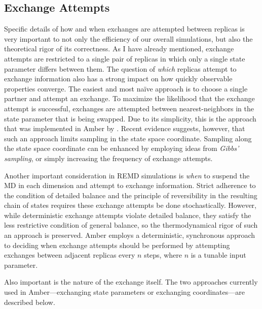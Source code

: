 \subsection{Exchange Attempts}

Specific details of how and when exchanges are attempted between replicas is
very important to not only the efficiency of our overall simulations, but also
the theoretical rigor of its correctness. As I have already mentioned, exchange
attempts are restricted to a single pair of replicas in which only a single
state parameter differs between them. The question of \emph{which} replicas
attempt to exchange information also has a strong impact on how quickly
observable properties converge. The easiest and most na\"ive approach is to
choose a single partner and attempt an exchange. To maximize the likelihood that
the exchange attempt is successful, exchanges are attempted between
nearest-neighbors in the state parameter that is being swapped. Due to its
simplicity, this is the approach that was implemented in Amber by
\citeauthor{Cheng2005}. \cite{Cheng2005} Recent evidence suggests, however, that
such an approach limits sampling in the state space coordinate.
\cite{Chodera_JChemPhys_2011_v135_p194110} Sampling along the state space
coordinate can be enhanced by employing ideas from \emph{Gibbs' sampling},
\cite{Chodera_JChemPhys_2011_v135_p194110} or simply increasing the frequency
of exchange attempts. \cite{Sindhikara2008, Sindhikara2010}

Another important consideration in REMD simulations is \emph{when} to suspend
the MD in each dimension and attempt to exchange information. Strict adherence
to the condition of detailed balance and the principle of reversibility in the
resulting chain of states requires these exchange attempts be done
stochastically. \cite{Chodera_JChemPhys_2011_v135_p194110} However, while
deterministic exchange attempts violate detailed balance, they satisfy the less
restrictive condition of general balance, so the thermodynamical rigor of such
an approach is preserved. \cite{Chodera_JChemPhys_2011_v135_p194110} Amber
employs a deterministic, synchronous approach to deciding when exchange attempts
should be performed by attempting exchanges between adjacent replicas every $n$
steps, where $n$ is a tunable input parameter.

Also important is the nature of the exchange itself. The two approaches
currently used in Amber---exchanging state parameters or exchanging
coordinates---are described below.

